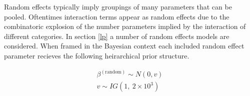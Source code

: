 \documentclass[12pt]{article}
\begin{document}
%
%

%
Random effects typically imply groupings of many parameters that can be 
pooled. Oftentimes interaction terms appear as random effects due 
to the combinatoric explosion of the number parameters implied by the 
interaction of different categories. In section \ref{lp} a number of random 
effects models are considered. When framed in the Bayesian context each 
included random effect parameter recieves the following heirarchical prior 
structure.  

%
\begin{align}
\beta^{(\text{random})} \sim N(0, v)\\
v \sim IG(1,~2\times10^{3})
\end{align}
\end{document}
